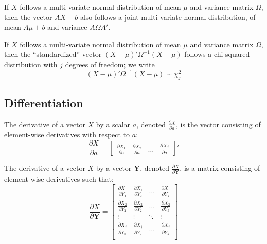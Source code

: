 \begin{proposition} 
If $X$ follows a multi-variate normal distribution of mean $\mu$ and variance matrix $\Omega$, then the vector $AX+b$ also follows a joint multi-variate normal distribution, of mean $A\mu+b$ and variance $A\Omega A'$.
\end{proposition}

\begin{proposition}
If $X$ follows a multi-variate normal distribution of mean $\mu$ and variance matrix $\Omega$, then the ``standardized'' vector $(X - \mu)'\Omega^{-1}(X-\mu)$ follows a chi-squared distribution with $j$ degrees of freedom; we write $$(X - \mu)'\Omega^{-1}(X-\mu)\sim\chi_j^2$$
\end{proposition}

\subsection{Differentiation}

\begin{definition}
The derivative of a vector $X$ by a scalar $a$, denoted $\frac{\partial X}{\partial a}$, is the vector consisting of element-wise derivatives with respect to $a$: $$\frac{\partial X}{\partial a} = \begin{bmatrix}
\frac{\partial X_1}{\partial a} & \frac{\partial X_2}{\partial a} & \hdots & \frac{\partial X_j}{\partial a}
\end{bmatrix}' $$
\end{definition}

\begin{definition}
The derivative of a vector $X$ by a vector $\mathbf{Y}$, denoted $\frac{\partial X}{\partial \mathbf{Y}}$, is a matrix consisting of element-wise derivatives such that: $$\frac{\partial X}{\partial \mathbf{Y}} = \begin{bmatrix}
\frac{\partial X_1}{\partial Y_1} & \frac{\partial X_1}{\partial Y_2} & \hdots & \frac{\partial X_1}{\partial Y_k} \\
\frac{\partial X_2}{\partial Y_1} & \frac{\partial X_2}{\partial Y_2} & \hdots & \frac{\partial X_2}{\partial Y_k} \\
\vdots & \vdots & \ddots & \vdots \\
\frac{\partial X_j}{\partial Y_1} & \frac{\partial X_j}{\partial Y_2} & \hdots & \frac{\partial X_j}{\partial Y_k} \\
\end{bmatrix} $$
\end{definition}

